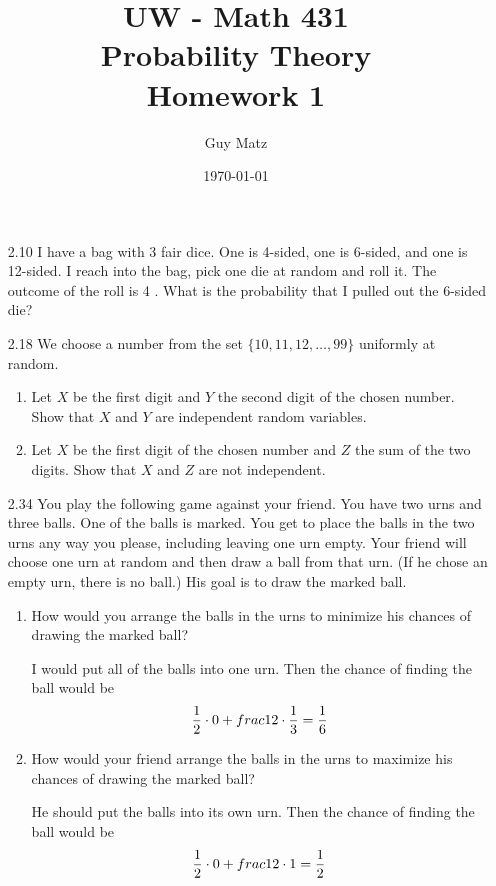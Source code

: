\documentclass[10pt]{article}
\title{UW - Math 431 \\
Probability Theory \\
Homework 1}
\author{Guy Matz}
\date{\today}
\begin{document}
\maketitle

\begin{itemize}

  \item[2.10] I have a bag with 3 fair dice. One is 4-sided, one is 6-sided, and one is 12-sided. I reach into the bag, pick one die at random and roll it. The outcome of the roll is 4 . What is the probability that I pulled out the 6-sided die?

\newpage
  \item[2.18] We choose a number from the set $\{10,11,12, \ldots, 99\}$
    uniformly at random.
    \begin{enumerate}
      \item Let $X$ be the first digit and $Y$ the second digit of the chosen number. Show that $X$ and $Y$ are independent random variables.

      \item Let $X$ be the first digit of the chosen number and $Z$ the sum of the two digits. Show that $X$ and $Z$ are not independent.
    \end{enumerate}

\newpage
  \item[2.34] You play the following game against your friend. You have two urns and three balls. One of the balls is marked. You get to place the balls in the two urns any way you please, including leaving one urn empty. Your friend will choose one urn at random and then draw a ball from that urn. (If he chose an empty urn, there is no ball.) His goal is to draw the marked ball.

    \begin{enumerate}
      \item How would you arrange the balls in the urns to minimize his chances of drawing the marked ball?

        I would put all of the balls into one urn.  Then the chance of
        finding the ball would be
        \[ \frac{1}{2} \cdot 0 + \\frac{1}{2} \cdot \frac{1}{3} = \frac{1}{6}  \]

      \item How would your friend arrange the balls in the urns to maximize his chances of drawing the marked ball?

        He should put the balls into its own urn.  Then the chance of
        finding the ball would be
        \[ \frac{1}{2} \cdot 0 + \\frac{1}{2} \cdot 1 = \frac{1}{2}  \]


\end{enumerate}
\end{itemize}
\end{document}
